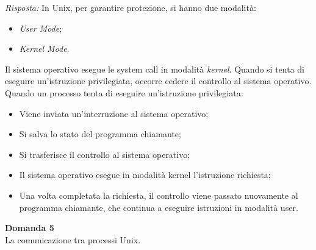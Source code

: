 \documentclass{article}
\newenvironment{problem}[2][Domanda]
    { \begin{mdframed}[backgroundcolor=gray!20] \textbf{#1 #2} \\}
    {  \end{mdframed}}
\newenvironment{solution}
    {\textit{Risposta:}}
    {}
\begin{document}
\begin{solution}
In Unix, per garantire protezione, si hanno due modalità: 
\begin{itemize}
    \item \emph{User Mode};
    \item \emph{Kernel Mode}.
\end{itemize}
Il sistema operativo esegue le system call in modalità \textit{kernel}. Quando si tenta di eseguire un’istruzione privilegiata, occorre cedere il controllo al sistema operativo.
\newline
Quando un processo tenta di eseguire un’istruzione privilegiata:
\begin{itemize}
    \item Viene inviata un’interruzione al sistema operativo; 
    \item Si salva lo stato del programma chiamante; 
    \item Si trasferisce il controllo al sistema operativo;
    \item Il sistema operativo esegue in modalità kernel l’istruzione richiesta; 
    \item Una volta completata la richiesta, il controllo viene passato nuovamente al programma chiamante, che continua a eseguire istruzioni in modalità user.
\end{itemize}
\end{solution}
\begin{problem}{5}
La comunicazione tra processi Unix.
\end{problem}
\end{document}
